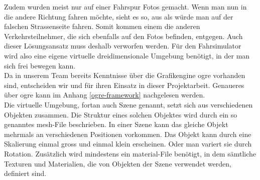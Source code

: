 Zudem wurden meist nur auf einer Fahrspur Fotos gemacht. Wenn man nun in die andere Richtung fahren möchte, sieht es so, aus als würde man auf der falschen Strassenseite fahren. Somit kommen einem die anderen Verkehrsteilnehmer, die sich ebenfalls auf den Fotos befinden, entgegen. Auch dieser Lösungsansatz muss deshalb verworfen werden.
Für den Fahrsimulator wird also eine eigene virtuelle dreidimensionale Umgebung benötigt, in der man sich frei bewegen kann.\\
Da in unserem Team bereits Kenntnisse über die Grafikengine \gls{ogre} vorhanden sind, entscheiden wir und für ihren Einsatz in dieser Projektarbeit. Genaueres über \gls{ogre} kann im Anhang \ref{ogre-framework} nachgelesen werden.\\
Die virtuelle Umgebung, fortan auch Szene genannt, setzt sich aus verschiedenen Objekten zusammen. Die Struktur eines solchen Objektes wird durch ein so genanntes mesh-File beschrieben. In einer Szene kann das gleiche Objekt mehrmals an verschiedenen Positionen vorkommen. Das Objekt kann durch eine Skalierung einmal gross und einmal klein erscheinen. Oder man variert sie durch Rotation. Zusätzlich wird mindestens ein material-File benötigt, in dem sämtliche Texturen und Materialien, die von Objekten der Szene verwendet werden, definiert sind.

